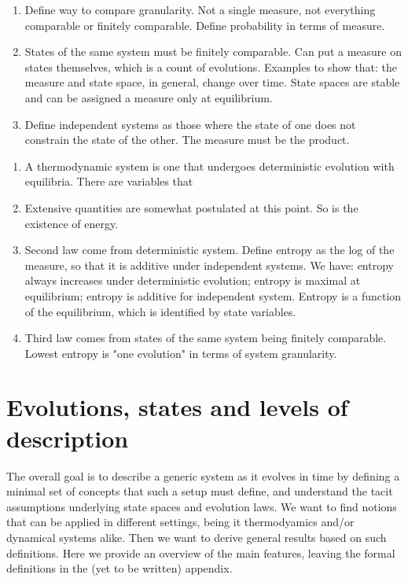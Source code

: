 \documentclass[letterpaper]{article}
\begin{document}
\begin{enumerate}
	\item Define way to compare granularity. Not a single measure, not everything comparable or finitely comparable. Define probability in terms of measure.
	\item States of the same system must be finitely comparable. Can put a measure on states themselves, which is a count of evolutions. Examples to show that: the measure and state space, in general, change over time. State spaces are stable and can be assigned a measure only at equilibrium.
	\item Define independent systems as those where the state of one does not constrain the state of the other. The measure must be the product.
	
\end{enumerate}

\begin{enumerate}
	\item A thermodynamic system is one that undergoes deterministic evolution with equilibria. There are variables that  
	\item Extensive quantities are somewhat postulated at this point. So is the existence of energy.
	\item Second law come from deterministic system.  Define entropy as the log of the measure, so that it is additive under independent systems. We have: entropy always increases under deterministic evolution; entropy is maximal at equilibrium; entropy is additive for independent system. Entropy is a function of the equilibrium, which is identified by state variables.
	\item Third law comes from states of the same system being finitely comparable. Lowest entropy is "one evolution" in terms of system granularity.
	
\end{enumerate}


\section{Evolutions, states and levels of description}

The overall goal is to describe a generic system as it evolves in time by defining a minimal set of concepts that such a setup must define, and understand the tacit assumptions underlying state spaces and evolution laws. We want to find notions that can be applied in different settings, being it thermodyamics and/or dynamical systems alike. Then we want to derive general results based on such definitions. Here we provide an overview of the main features, leaving the formal definitions in the (yet to be written) appendix.
\end{document}

